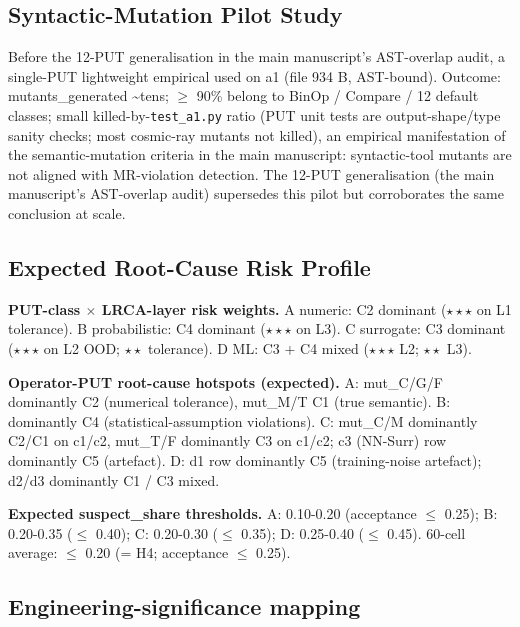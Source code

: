 \documentclass[manuscript,screen,review]{acmart}
\begin{document}
\subsection{Syntactic-Mutation Pilot Study}\label{b.3-cosmic-ray-a1-single-put-pilot-pre-12-put-empirical}

Before the 12-PUT generalisation in the main manuscript's AST-overlap audit, a single-PUT lightweight
empirical used  on a1 (file
934 B, AST-bound). Outcome: mutants\_generated \textasciitilde tens; $\geq$
90\% belong to BinOp / Compare / 12 default classes; small
killed-by-\texttt{test\_a1.py} ratio (PUT unit tests are
output-shape/type sanity checks; most cosmic-ray mutants not killed), an
empirical manifestation of the semantic-mutation criteria in the main manuscript: syntactic-tool mutants
are not aligned with MR-violation detection. The 12-PUT generalisation
(the main manuscript's AST-overlap audit) supersedes this pilot but corroborates the same conclusion at
scale.

\subsection{Expected Root-Cause Risk Profile}\label{b.4-expected-lrca-risk-profile}

\textbf{PUT-class $\times$ LRCA-layer risk weights.} A numeric: C2 dominant
($\star\star\star$ on L1 tolerance). B probabilistic: C4 dominant ($\star\star\star$ on L3). C
surrogate: C3 dominant ($\star\star\star$ on L2 OOD; $\star\star$ tolerance). D ML: C3 + C4
mixed ($\star\star\star$ L2; $\star\star$ L3).

\textbf{Operator-PUT root-cause hotspots (expected).} A: mut\_C/G/F
dominantly C2 (numerical tolerance), mut\_M/T C1 (true semantic). B:
dominantly C4 (statistical-assumption violations). C: mut\_C/M
dominantly C2/C1 on c1/c2, mut\_T/F dominantly C3 on c1/c2; c3 (NN-Surr)
row dominantly C5 (artefact). D: d1 row dominantly C5 (training-noise
artefact); d2/d3 dominantly C1 / C3 mixed.

\textbf{Expected suspect\_share thresholds.} A: 0.10-0.20 (acceptance $\leq$
0.25); B: 0.20-0.35 ($\leq$ 0.40); C: 0.20-0.30 ($\leq$ 0.35); D: 0.25-0.40 ($\leq$
0.45). 60-cell average: $\leq$ 0.20 (= H4; acceptance $\leq$ 0.25).

\subsection{Engineering-significance mapping}\label{b.5-engineering-significance-mapping}
\end{document}
